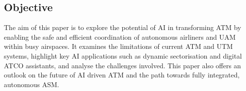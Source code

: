 \subsection{Objective}

The aim of this paper is to explore the potential of \gls{AI} in transforming \gls{ATM} by enabling the safe and efficient coordination of autonomous airliners and \gls{UAM} within busy airspaces.
It examines the limitations of current \gls{ATM} and \gls{UTM} systems, highlight key \gls{AI} applications such as dynamic sectorisation and digital \gls{ATCO} assistants, and analyse the  challenges involved. 
This paper also offers an outlook on the future of \gls{AI} driven \gls{ATM} and the path towards fully integrated, autonomous \gls{ASM}.